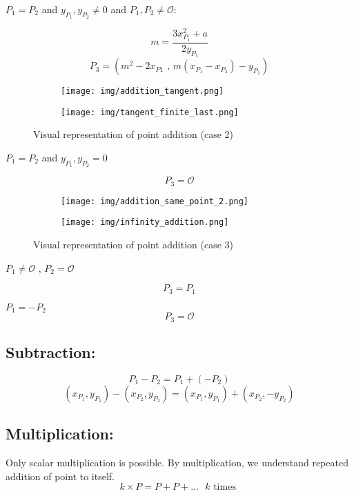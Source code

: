 \documentclass[bp,en]{FEIstyle}
\newcommand{\ycor}[1]{
y_{P_{#1}}
}
\begin{document}
 $P_1 = P_2$  and $y_{P_1},\ycor{2} \neq 0$ and $P_1,P_2 \neq \mathcal{O} $: \par
\[
m = \frac{3x_{P_1}^2 + a}{2y_{P_1}}
\]
\[
P_3 = (m^2 - 2{x_{P1}}\text{ , } m(x_{P_1} - x_{P_3}) - y_{P_1})
\]
\begin{figure}[H]
    \centering
    \begin{subfigure}{0.38\textwidth}
        \texttt{[image: img/addition\_tangent.png]}
        \label{fig:addition_curve_3}
    \end{subfigure}%
    \begin{subfigure}{0.42\textwidth}
        \texttt{[image: img/tangent\_finite\_last.png]}
        \label{fig:addition_curve_4}
    \end{subfigure}%
    \caption{Visual representation of point addition (case 2)}
    \label{fig:addition_elliptic_curves_2}
\end{figure}


 $P_1 = P_2$  and $\ycor{1},\ycor{2} = 0$ \par
\[
P_3 = \mathcal{O} 
\]
\begin{figure}[ht]
    \centering
    \begin{subfigure}{0.4\textwidth}
        \texttt{[image: img/addition\_same\_point\_2.png]}
        \label{fig:addition_curve_5}
    \end{subfigure}%
    \begin{subfigure}{0.405\textwidth} 
        \texttt{[image: img/infinity\_addition.png]}
        \label{fig:addition_curve_6}
    \end{subfigure}%
    \caption{Visual representation of point addition (case 3)}
    \label{fig:addition_elliptic_curves_3}
\end{figure}
 $P_1 \neq \mathcal{O}$ , $P_2 = \mathcal{O}$  \par
\[
P_3 = P_1 
\]

 $P_1 = -P_2$ 
\[
P_3 = \mathcal{O}
\]
\subsection*{Subtraction:}
\[
P_1 - P_2 = P_1 + (-P_2)
\]
\[ 
(x_{P_1}, y_{P_1}) - (x_{P_2}, y_{P_2}) = (x_{P_1}, y_{P_1}) + (x_{P_2}, -y_{P_2})
\]
\subsection*{Multiplication:}
Only scalar multiplication is possible. By multiplication, we understand repeated addition of point to itself.
\[
k\times P = P + P + ... \text{ } k \text{ times }
\] %
\end{document}
